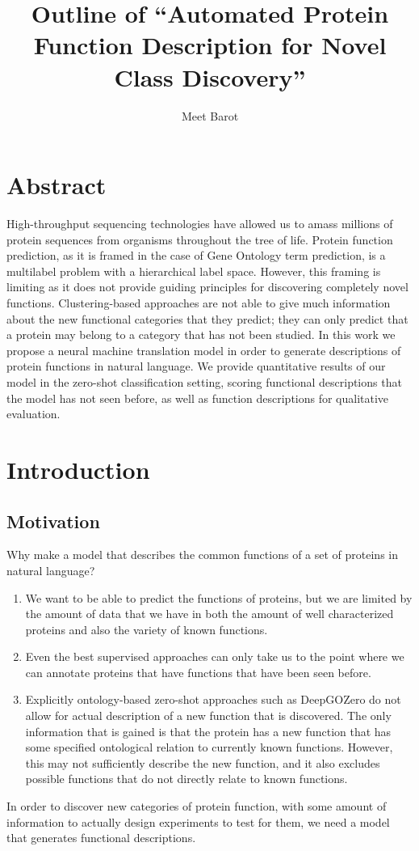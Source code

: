 \documentclass{specification}
\title{Outline of ``Automated Protein Function Description for Novel Class Discovery''}
\author{Meet Barot}
\begin{document}
\maketitle

\section{Abstract}
High-throughput sequencing technologies have allowed us to amass millions of protein sequences from organisms throughout the tree of life.
Protein function prediction, as it is framed in the case of Gene Ontology term prediction, is a multilabel problem with a hierarchical label space.
However, this framing is limiting as it does not provide guiding principles for discovering completely novel functions.
Clustering-based approaches are not able to give much information about the new functional categories that they predict; they can only predict that a protein may belong to a category that has not been studied.
In this work we propose a neural machine translation model in order to generate descriptions of protein functions in natural language.
We provide quantitative results of our model in the zero-shot classification setting, scoring functional descriptions that the model has not seen before, as well as function descriptions for qualitative evaluation.

\section{Introduction}

    \subsection{Motivation}
    Why make a model that describes the common functions of a set of proteins in natural language?
    \begin{enumerate}
        \item We want to be able to predict the functions of proteins, but we are limited by the amount of data that we have in both the amount of well characterized proteins and also the variety of known functions.
        \item Even the best supervised approaches can only take us to the point where we can annotate proteins that have functions that have been seen before.
        \item Explicitly ontology-based zero-shot approaches such as DeepGOZero \cite{DeepGOZero} do not allow for actual description of a new function that is discovered.
The only information that is gained is that the protein has a new function that has some specified ontological relation to currently known functions.
However, this may not sufficiently describe the new function, and it also excludes possible functions that do not directly relate to known functions.
    \end{enumerate}
    In order to discover new categories of protein function, with some amount of information to actually design experiments to test for them, we need a model that generates functional descriptions.
\end{document}
